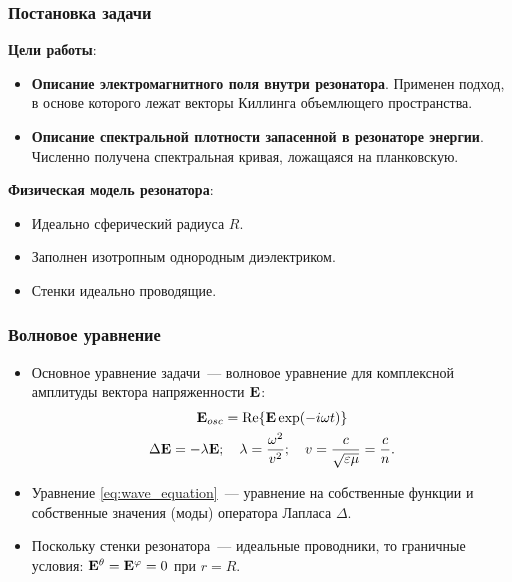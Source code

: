 \documentclass[compress]{beamer}
\begin{document}
    \begin{frame}\frametitle{Постановка задачи}

        \textbf{Цели работы}:
        \begin{itemize}\justifying
            \item \textbf{Описание электромагнитного поля внутри резонатора}.
                Применен подход, в основе которого лежат векторы Киллинга объемлющего пространства.
            \item \textbf{Описание спектральной плотности запасенной в резонаторе энергии}.
                Численно получена спектральная кривая, ложащаяся на планковскую.
        \end{itemize}

        \textbf{Физическая модель резонатора}:
        \begin{itemize}\justifying
            \item Идеально сферический радиуса $R$.
            \item Заполнен изотропным однородным диэлектриком.
            \item Стенки идеально проводящие.
        \end{itemize}

    \end{frame}


    \begin{frame}\frametitle{Волновое уравнение}

        \begin{itemize}\justifying

            \item Основное уравнение задачи~--- волновое уравнение для комплексной амплитуды вектора напряженности $\mathbf{E}$:
            \begin{gather}
                \vb{E}_{osc} = \Re{\vb{E} \exp(-i \omega t)} \nonumber \\
                \Delta \mathbf{E} = - \lambda \mathbf{E} ; \quad
                    \lambda = \frac{\omega^2}{v^2} ; \quad
                    v = \frac{c}{\sqrt{\varepsilon\mu}} = \frac{c}{n} \label{eq:wave_equation}.
            \end{gather}

            \item Уравнение \autoref{eq:wave_equation}~--- уравнение на собственные функции и собственные значения (моды) оператора Лапласа $\Delta$.

            \item Поскольку стенки резонатора~--- идеальные проводники, то граничные условия: $\vb{E}^\theta = \vb{E}^\varphi = 0$ при $r = R$.

        \end{itemize}

    \end{frame}
\end{document}
